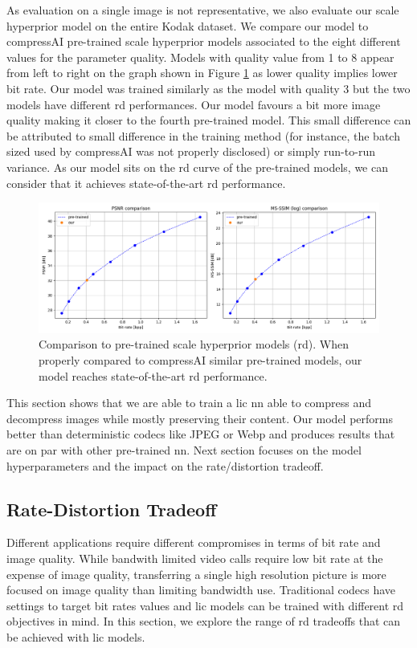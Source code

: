 As evaluation on a single image is not representative, we also evaluate our scale hyperprior model on the entire Kodak dataset. We compare our model to compressAI pre-trained scale hyperprior models associated to the eight different values for the parameter \textsf{quality}. Models with \textsf{quality} value from 1 to 8 appear from left to right on the graph shown in Figure \ref{balle_repro_6} as lower quality implies lower bit rate. Our model was trained similarly as the model with \textsf{quality} 3 but the two models have different \acrshort{rd} performances. Our model favours a bit more image quality making it closer to the fourth pre-trained model. This small difference can be attributed to small difference in the training method (for instance, the batch sized used by compressAI was not properly disclosed) or simply run-to-run variance. As our model sits on the \acrshort{rd} curve of the pre-trained models, we can consider that it achieves state-of-the-art \acrshort{rd} performance. 

\begin{figure}
    \centering
    \includegraphics[width=15cm]{img/balle_repro_rd_2.png}
    \caption[Comparison to pre-trained scale hyperprior models (\acrshort{rd}).]{Comparison to pre-trained scale hyperprior models (\acrshort{rd}). When properly compared to compressAI similar pre-trained models, our model reaches state-of-the-art \acrshort{rd} performance.}
    \label{balle_repro_6}
\end{figure}

This section shows that we are able to train a \acrshort{lic} \acrshort{nn} able to compress and decompress images while mostly preserving their content. Our model performs better than deterministic codecs like JPEG or Webp and produces results that are on par with other pre-trained \acrshort{nn}. Next section focuses on the model hyperparameters and the impact on the rate/distortion tradeoff.

\subsection{Rate-Distortion Tradeoff}
Different applications require different compromises in terms of bit rate and image quality. While bandwith limited video calls require low bit rate at the expense of image quality, transferring a single high resolution picture is more focused on image quality than limiting bandwidth use. Traditional codecs have settings to target bit rates values and \acrshort{lic} models can be trained with different \acrshort{rd} objectives in mind. In this section, we explore the range of \acrshort{rd} tradeoffs that can be achieved with \acrshort{lic} models.


